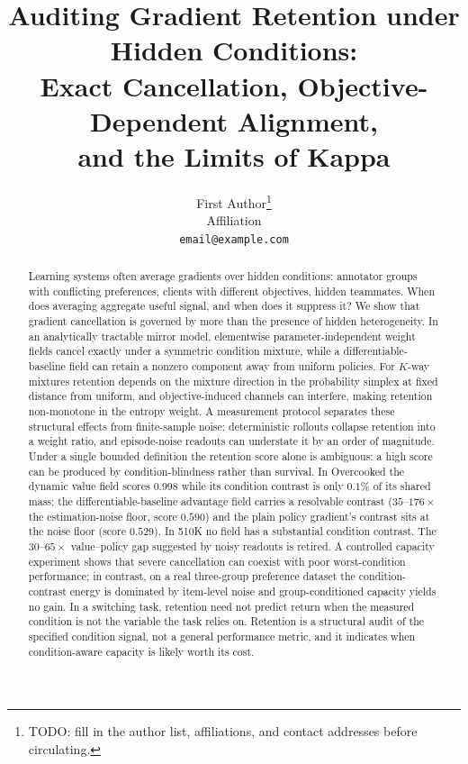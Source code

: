 \documentclass{article}
\title{Auditing Gradient Retention under Hidden Conditions:\\
Exact Cancellation, Objective-Dependent Alignment,\\
and the Limits of Kappa}
\author{%
  First Author\thanks{TODO: fill in the author list, affiliations, and
  contact addresses before circulating.} \\
  Affiliation \\
  \texttt{email@example.com}
}
\begin{document}
\maketitle

\noindent{}
\vspace{0.4em}

\begin{abstract}
Learning systems often average gradients over hidden conditions: annotator
groups with conflicting preferences, clients with different objectives,
hidden teammates. When does averaging aggregate useful signal, and when does
it suppress it? We show that gradient cancellation is governed by more than
the presence of hidden heterogeneity. In an analytically tractable mirror
model, elementwise parameter-independent weight fields cancel exactly under a
symmetric condition mixture, while a differentiable-baseline field can retain
a nonzero component away from uniform policies. For $K$-way mixtures retention
depends on the mixture direction in the probability simplex at fixed distance
from uniform, and objective-induced channels can interfere, making retention
non-monotone in the entropy weight. A measurement protocol separates these
structural effects from finite-sample noise: deterministic rollouts collapse
retention into a weight ratio, and episode-noise readouts can understate it by
an order of magnitude. Under a single
bounded definition the retention score alone is ambiguous: a high score can
be produced by condition-blindness rather than survival. In Overcooked the
dynamic value field scores $0.998$ while its condition contrast is only
$0.1\%$ of its shared mass; the differentiable-baseline advantage field
carries a resolvable contrast ($35$--$176\times$ the estimation-noise floor,
score $0.590$) and the plain policy gradient's contrast sits at the noise
floor (score $0.529$). In 510K no field has a substantial condition
contrast. The $30$--$65\times$ value--policy gap suggested by noisy readouts
is retired. A
controlled capacity experiment shows that severe cancellation can coexist with
poor worst-condition performance; in contrast, on a real three-group
preference dataset the condition-contrast energy is dominated by item-level
noise and group-conditioned capacity yields no gain. In a switching task,
retention need not predict return when the measured condition is not the
variable the task relies on. Retention is a structural audit of the specified
condition signal, not a general performance metric, and it indicates when
condition-aware capacity is likely worth its cost.
\end{abstract}
\end{document}

